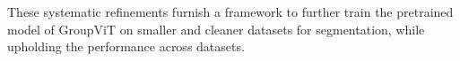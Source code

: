 These systematic refinements furnish a framework to further train the pretrained model of  GroupViT on smaller and cleaner datasets for segmentation, while upholding the performance across datasets.




